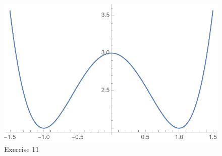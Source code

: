 \documentclass[letterpaper, landscape]{exam}
\begin{document}
\begin{description}
      \begin{figure}[H]
        \centering
        \includegraphics[scale = 0.6]{ex11.pdf}
        \caption{Exercise 11}
        \label{fig:ex11}
      \end{figure}

    \newpage




          




\end{description}
\end{document}
